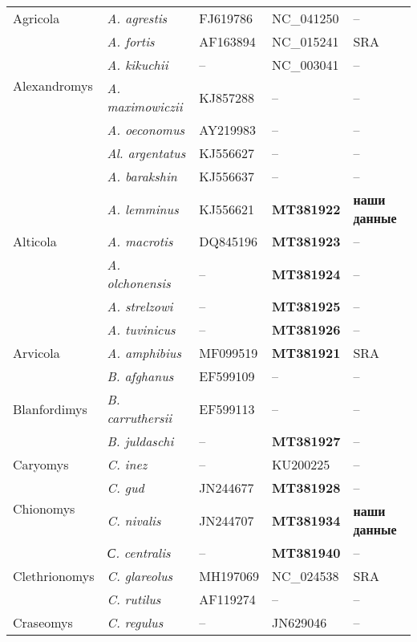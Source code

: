 \begin{landscape}
\begin{center}
\begin{longtable}{|p{3.5cm}|p{4.5cm}|p{4.0cm}|p{6.5cm}|p{4.5cm}|}
Agricola & \textit{A. agrestis}  & FJ619786 & NC\_041250 & --\\ \cline{2-5}
\multirow{4}{*}{Alexandromys} & \textit{A. fortis} & AF163894 & NC\_015241 & SRA\\ \cline{2-5}
& \textit{A. kikuchii} & -- & NC\_003041 & --\\ \cline{2-5}
& \textit{A. maximowiczii} & KJ857288 & -- & --\\ \cline{2-5}
& \textit{A. oeconomus} & AY219983 & -- & --\\ \hline
\multirow{7}{*}{Alticola} & \textit{Al. argentatus} & KJ556627 & -- & --\\ \cline{2-5}
& \textit{A. barakshin} & KJ556637  & -- & --\\ \cline{2-5}
& \textit{A. lemminus} & KJ556621 & \textbf{MT381922} & \textbf{наши данные}\\ \cline{2-5}
& \textit{A. macrotis} & DQ845196 & \textbf{MT381923} & --\\ \cline{2-5}
& \textit{A. olchonensis} & -- & \textbf{MT381924} & --\\ \cline{2-5}
& \textit{A. strelzowi} & -- & \textbf{MT381925} & --\\ \cline{2-5}
& \textit{A. tuvinicus} & -- & \textbf{MT381926} & --\\ \hline
Arvicola & \textit{A. amphibius} & MF099519  & \textbf{MT381921} & SRA\\ \hline
\multirow{3}{*}{Blanfordimys} & \textit{B. afghanus} & EF599109 & -- & --\\ \cline{2-5}
& \textit{B. carruthersii} & EF599113 & -- & --\\ \cline{2-5}
& \textit{B. juldaschi} & -- & \textbf{MT381927} & --\\ \hline
Caryomys & \textit{C. inez} & -- & KU200225 & --\\ \hline
\multirow{2}{*}{Chionomys} & \textit{C. gud} & JN244677 & \textbf{MT381928} & --\\ \cline{2-5}
& \textit{C. nivalis} & JN244707 & \textbf{MT381934} & \textbf{наши данные}\\ \hline
\multirow{3}{*}{Clethrionomys} & \textit{С. centralis} & -- & \textbf{MT381940} & --\\ \cline{2-5}
& \textit{C. glareolus} & MH197069 & NC\_024538 & SRA\\ \cline{2-5}
& \textit{C. rutilus} & AF119274 & -- & --\\ \hline
\multirow{3}{*}{Craseomys} & \textit{C. regulus} & -- & JN629046 & -- \\ \cline{2-5}

\end{longtable}
\end{center}
\end{landscape}
